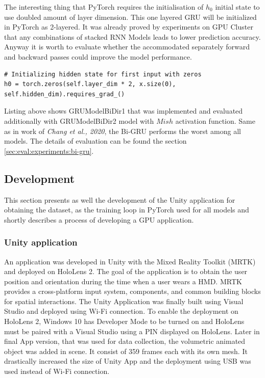 The interesting thing that PyTorch requires the initialisation of $h_0$ initial state to use doubled amount of layer dimension. This one layered GRU will be initialized in PyTorch as 2-layered. It was already proved by experiments on GPU Cluster that any combinations of stacked RNN Models leads to lower prediction accuracy. Anyway it is worth to evaluate whether the accommodated separately forward and backward passes could improve the model performance.  
\begin{lstlisting}[caption={Bidirectional GRU h0 Layer},captionpos=b]
# Initializing hidden state for first input with zeros
h0 = torch.zeros(self.layer_dim * 2, x.size(0), self.hidden_dim).requires_grad_()
\end{lstlisting}

Listing above shows GRUModelBiDir1 that was implemented and evaluated additionally with GRUModelBiDir2 model with $Mish$ activation function. Same as in work of \textit{Chang et al., 2020}, the Bi-GRU performs the worst among all models. The details of evaluation can be found the section \ref{sec:eval:experiments:bi-gru}.


\subsection{Development}
\label{sec:impl:model:dev}
This section presents as well the development of the Unity application for obtaining the dataset, as the training loop in PyTorch used for all models and shortly describes a process of developing a GPU application. 

\subsubsection{Unity application}
\label{sec:impl:model:dev:unity}
An application was developed in Unity with the Mixed Reality Toolkit (MRTK) and deployed on HoloLens 2. The goal of the application is to obtain the user position and orientation during the time when a user wears a HMD. MRTK provides a cross-platform input system, components, and common building blocks for spatial interactions. The Unity Application was finally built using Visual Studio and deployed using Wi-Fi connection. To enable the deployment on HoloLens 2, Windows 10 has Developer Mode to be turned on and HoloLens must be paired with a Visual Studio using a PIN displayed on HoloLens. Later in final App version, that was used for data collection, the volumetric animated object was added in scene. It consist of 359 frames each with its own mesh. It drastically increased the size of Unity App and the deployment using USB was used instead of Wi-Fi connection.

